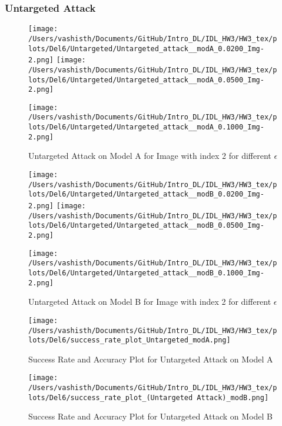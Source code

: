 \begin{solve}
\subsubsection{Untargeted Attack}

\begin{figure}[H]
    \centering
    \texttt{[image: /Users/vashisth/Documents/GitHub/Intro\_DL/IDL\_HW3/HW3\_tex/plots/Del6/Untargeted/Untargeted\_attack\_\_modA\_0.0200\_Img-2.png]}
    \centering
    \texttt{[image: /Users/vashisth/Documents/GitHub/Intro\_DL/IDL\_HW3/HW3\_tex/plots/Del6/Untargeted/Untargeted\_attack\_\_modA\_0.0500\_Img-2.png]}

    \centering
    \texttt{[image: /Users/vashisth/Documents/GitHub/Intro\_DL/IDL\_HW3/HW3\_tex/plots/Del6/Untargeted/Untargeted\_attack\_\_modA\_0.1000\_Img-2.png]}
    \caption{Untargeted Attack on Model A for Image with index 2 for different $\epsilon$}
\end{figure}


\begin{figure}[H]
    \centering
    \texttt{[image: /Users/vashisth/Documents/GitHub/Intro\_DL/IDL\_HW3/HW3\_tex/plots/Del6/Untargeted/Untargeted\_attack\_\_modB\_0.0200\_Img-2.png]}
    \centering
    \texttt{[image: /Users/vashisth/Documents/GitHub/Intro\_DL/IDL\_HW3/HW3\_tex/plots/Del6/Untargeted/Untargeted\_attack\_\_modB\_0.0500\_Img-2.png]}

    \centering
    \texttt{[image: /Users/vashisth/Documents/GitHub/Intro\_DL/IDL\_HW3/HW3\_tex/plots/Del6/Untargeted/Untargeted\_attack\_\_modB\_0.1000\_Img-2.png]}
    \caption{Untargeted Attack on Model B for Image with index 2 for different $\epsilon$}
\end{figure}

\begin{figure}[H]
\centering
\texttt{[image: /Users/vashisth/Documents/GitHub/Intro\_DL/IDL\_HW3/HW3\_tex/plots/Del6/success\_rate\_plot\_Untargeted\_modA.png]}
\caption{Success Rate and Accuracy Plot for Untargeted Attack on Model A}
\texttt{[image: /Users/vashisth/Documents/GitHub/Intro\_DL/IDL\_HW3/HW3\_tex/plots/Del6/success\_rate\_plot\_(Untargeted Attack)\_modB.png]}
\caption{Success Rate and Accuracy Plot for Untargeted Attack on Model B}
\end{figure}


\end{solve}
